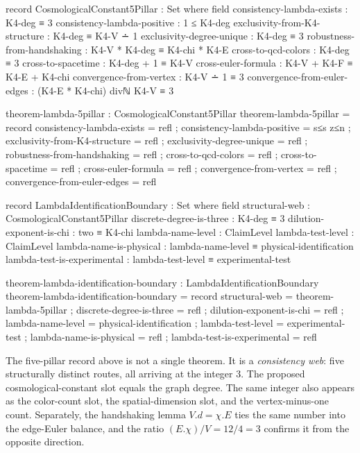\documentclass[11pt,a4paper]{book}
\def\cdot{.}%
\begin{document}
\begin{code}
record CosmologicalConstant5Pillar : Set where
  field
    consistency-lambda-exists : K4-deg ≡ 3
    consistency-lambda-positive : 1 ≤ K4-deg
    exclusivity-from-K4-structure : K4-deg ≡ K4-V ∸ 1
    exclusivity-degree-unique : K4-deg ≡ 3
    robustness-from-handshaking : K4-V * K4-deg ≡ K4-chi * K4-E
    cross-to-qcd-colors : K4-deg ≡ 3
    cross-to-spacetime : K4-deg + 1 ≡ K4-V
    cross-euler-formula : K4-V + K4-F ≡ K4-E + K4-chi
    convergence-from-vertex : K4-V ∸ 1 ≡ 3
    convergence-from-euler-edges : (K4-E * K4-chi) divℕ K4-V ≡ 3

theorem-lambda-5pillar : CosmologicalConstant5Pillar
theorem-lambda-5pillar = record
  { consistency-lambda-exists = refl
  ; consistency-lambda-positive = s≤s z≤n
  ; exclusivity-from-K4-structure = refl
  ; exclusivity-degree-unique = refl
  ; robustness-from-handshaking = refl
  ; cross-to-qcd-colors = refl
  ; cross-to-spacetime = refl
  ; cross-euler-formula = refl
  ; convergence-from-vertex = refl
  ; convergence-from-euler-edges = refl }

record LambdaIdentificationBoundary : Set where
  field
    structural-web             : CosmologicalConstant5Pillar
    discrete-degree-is-three   : K4-deg ≡ 3
    dilution-exponent-is-chi   : two ≡ K4-chi
    lambda-name-level          : ClaimLevel
    lambda-test-level          : ClaimLevel
    lambda-name-is-physical    : lambda-name-level ≡ physical-identification
    lambda-test-is-experimental : lambda-test-level ≡ experimental-test

theorem-lambda-identification-boundary : LambdaIdentificationBoundary
theorem-lambda-identification-boundary = record
  { structural-web              = theorem-lambda-5pillar
  ; discrete-degree-is-three    = refl
  ; dilution-exponent-is-chi    = refl
  ; lambda-name-level           = physical-identification
  ; lambda-test-level           = experimental-test
  ; lambda-name-is-physical     = refl
  ; lambda-test-is-experimental = refl }
\end{code}

The five-pillar record above is not a single theorem. It is a \emph{consistency web}: five structurally distinct routes, all arriving at the integer $3$. The proposed cosmological-constant slot equals the graph degree. The same integer also appears as the color-count slot, the spatial-dimension slot, and the vertex-minus-one count. Separately, the handshaking lemma $V \cdot d = \chi \cdot E$ ties the same number into the edge-Euler balance, and the ratio $(E \cdot \chi)/V = 12/4 = 3$ confirms it from the opposite direction.
\end{document}
